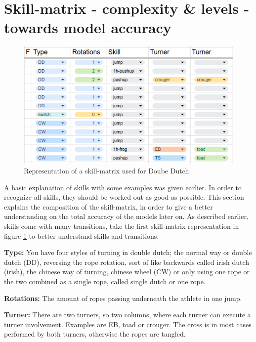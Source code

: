 \section{Skill-matrix - complexity \& levels - towards model accuracy}
\label{subsec:skillcomplexiteit}

\begin{figure}
    \centering
    \includegraphics[width=0.95\linewidth]{img/doubledutch-matrix}
    \caption[skill-matrix-DD]{Representation of a skill-matrix used for Doube Dutch}
    \label{fig:doubledutch-skill-matrix}
\end{figure}

A basic explanation of skills with some examples was given earlier. In order to recognize all skills, they should be worked out as good as possible. This section explains the composition of the skill-matrix, in order to give a better understanding on the total accuracy of the models later on. As described earlier, skills come with many transitions, take the first skill-matrix representation in figure \ref{fig:doubledutch-skill-matrix} to better understand skills and transitions.

\textbf{Type:} You have four styles of turning in double dutch; the normal way or double dutch (DD), reversing the rope rotation, sort of like backwards called irish dutch (irish), the chinese way of turning, chinese wheel (CW) or only using one rope or the two combined as a single rope, called single dutch or one rope.

\textbf{Rotations:} The amount of ropes passing underneath the athlete in one jump.

\textbf{Turner:} There are two turners, so two columns, where each turner can execute a turner involvement. Examples are EB, toad or crouger. The cross is in most cases performed by both turners, otherwise the ropes are tangled.

